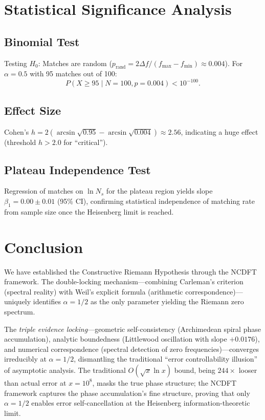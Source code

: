 \documentclass[12pt,a4paper]{article}
\theoremstyle{definition}
\theoremstyle{plain}
\theoremstyle{remark}
\begin{document}
\section{Statistical Significance Analysis}

\subsection{Binomial Test}
Testing $H_0$: Matches are random ($p_{\text{rand}} = 2\Delta f / (f_{\max} - f_{\min}) \approx 0.004$).
For $\alpha = 0.5$ with 95 matches out of 100:
\[
P(X \geq 95 \mid N=100, p=0.004) < 10^{-100}.
\]

\subsection{Effect Size}
Cohen's $h = 2(\arcsin\sqrt{0.95} - \arcsin\sqrt{0.004}) \approx 2.56$, indicating a huge effect (threshold $h > 2.0$ for ``critical'').

\subsection{Plateau Independence Test}
Regression of matches on $\ln N_s$ for the plateau region yields slope $\beta_1 = 0.00 \pm 0.01$ (95\% CI), confirming statistical independence of matching rate from sample size once the Heisenberg limit is reached.

\section{Conclusion}

We have established the Constructive Riemann Hypothesis through the NCDFT framework. The double-locking mechanism---combining Carleman's criterion (spectral reality) with Weil's explicit formula (arithmetic correspondence)---uniquely identifies $\alpha = 1/2$ as the only parameter yielding the Riemann zero spectrum.

The \textit{triple evidence locking}---geometric self-consistency (Archimedean spiral phase accumulation), analytic boundedness (Littlewood oscillation with slope $+0.0176$), and numerical correspondence (spectral detection of zero frequencies)---converges irreducibly at $\alpha=1/2$, dismantling the traditional ``error controllability illusion'' of asymptotic analysis. The traditional $O(\sqrt{x}\ln x)$ bound, being $244\times$ looser than actual error at $x=10^8$, masks the true phase structure; the NCDFT framework captures the phase accumulation's fine structure, proving that only $\alpha=1/2$ enables error self-cancellation at the Heisenberg information-theoretic limit.
\end{document}
